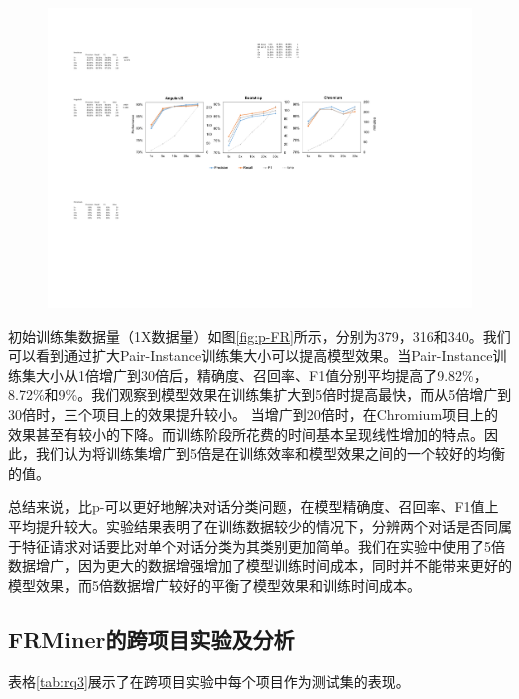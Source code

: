 \begin{figure}[htb]
\centering
\includegraphics[width=\textwidth]{Img/FRMiner_size.pdf}
\label{fig:FR-size}
\end{figure} 

初始训练集数据量（1X数据量）如图\ref{fig:p-FR}所示，分别为379，316和340。我们可以看到通过扩大Pair-Instance训练集大小可以提高模型效果。当Pair-Instance训练集大小从1倍增广到30倍后，精确度、召回率、F1值分别平均提高了9.82\%，8.72\%和9\%。我们观察到模型效果在训练集扩大到5倍时提高最快，而从5倍增广到30倍时，三个项目上的效果提升较小。 当增广到20倍时，在Chromium项目上的效果甚至有较小的下降。而训练阶段所花费的时间基本呈现线性增加的特点。因此，我们认为将训练集增广到5倍是在训练效率和模型效果之间的一个较好的均衡的值。

总结来说，{\tool}比p-{\tool}可以更好地解决对话分类问题，在模型精确度、召回率、F1值上平均提升较大。实验结果表明了在训练数据较少的情况下，分辨两个对话是否同属于特征请求对话要比对单个对话分类为其类别更加简单。我们在实验中使用了5倍数据增广，因为更大的数据增强增加了模型训练时间成本，同时并不能带来更好的模型效果，而5倍数据增广较好的平衡了模型效果和训练时间成本。

\subsection{FRMiner的跨项目实验及分析}

表格\ref{tab:rq3}展示了在跨项目实验中每个项目作为测试集的表现。


